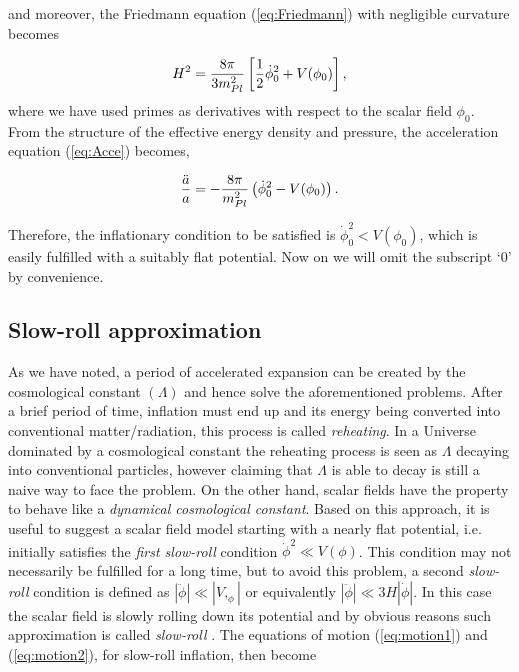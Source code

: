 \documentclass{rmaa}
\def\beq{\begin{equation}}
\def\eeq{\end{equation}}
\begin{document}
\noindent
and moreover, the Friedmann equation (\ref{eq:Friedmann}) with negligible curvature becomes

\beq \label{eq:motion2}
H^2 = \frac{8\pi}{3m^2_{Pl}} \left[{1 \over 2} \dot\phi_0^2 +V(\phi_0)\right],
\eeq
where we have used 
primes as derivatives with respect to the scalar field $\phi_0$. 
\\

 From the structure of the effective energy density and pressure, the acceleration
  equation (\ref{eq:Acce}) becomes, 
 
 \beq
 {\ddot a \over a} = -{8\pi \over m_{Pl}^2}\left(\dot \phi_0^2-V(\phi_0) \right).
 \eeq
 
 \noindent
 Therefore, the inflationary condition to be satisfied is $\dot \phi_0^2 < V(\phi_0)$, which 
 is easily fulfilled with a suitably flat potential. Now on we will omit the subscript
 `0' by convenience.



\subsection{Slow-roll approximation}
\vskip 6pt

As we have noted, a period of accelerated expansion can be created by 
the cosmological constant $(\Lambda)$ and hence solve the aforementioned problems.
After a brief period of time, inflation must end up and its energy being converted into conventional
matter/radiation, this process is called \textit{reheating}. In a Universe dominated by a 
cosmological constant the reheating process is seen as $\Lambda$ decaying into 
conventional particles, however claiming that $\Lambda$ is able to decay is still a 
naive way to face the problem.   
%
On the other hand, scalar fields have the property to behave like a 
\textit{dynamical cosmological constant}. Based on this approach, it is useful to
suggest a scalar field model starting with a nearly flat potential, i.e. initially 
satisfies the \textit{first slow-roll} condition $\dot \phi^2 \ll V(\phi)$. 
This condition may not necessarily be fulfilled for a long time, but
to avoid this problem, a second \textit{slow-roll} condition is defined as 
$|\ddot{\phi}|\ll |V,_{\phi}|$ or equivalently $|\ddot{\phi}|\ll 3H|\dot{\phi}|$. In this case the scalar field is slowly rolling 
down its potential and by obvious reasons such approximation is called \textit{slow-roll} 
\citep{Liddle92, Liddle94}.
The equations of motion (\ref{eq:motion1}) 
 and (\ref{eq:motion2}), for slow-roll inflation, then become
 
\end{document}
